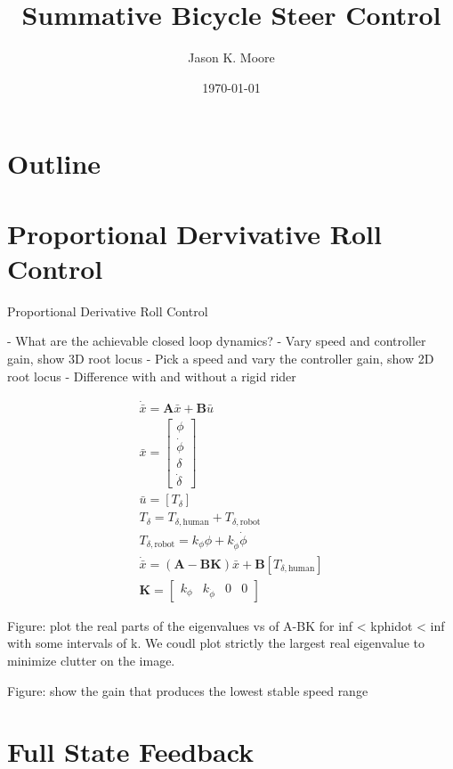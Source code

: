 \documentclass[12pt]{article}
\title{Summative Bicycle Steer Control}
\author{Jason K. Moore}
\date{\today}
\begin{document}
\maketitle

\section{Outline}

\section{Proportional Dervivative Roll Control}

Proportional Derivative Roll Control

- What are the achievable closed loop dynamics?
- Vary speed and controller gain, show 3D root locus
- Pick a speed and vary the controller gain, show 2D root locus
- Difference with and without a rigid rider

\begin{align}
  \dot{\bar{x}} = \mathbf{A} \bar{x} + \mathbf{B} \bar{u} \\
  \bar{x} = \begin{bmatrix} \phi \\ \dot{\phi} \\ \delta \\ \dot{\delta} \end{bmatrix} \\
  \bar{u} = \left[ T_\delta \right] \\
  T_\delta = T_{\delta,\textrm{human}} + T_{\delta,\textrm{robot}} \\
  T_{\delta,\textrm{robot}} = k_\phi \phi + k_{\dot{\phi}} \dot{\phi} \\
  \dot{\bar{x}} = \left( \mathbf{A} - \mathbf{B} \mathbf{K} \right) \bar{x} + \mathbf{B} \left[ T_{\delta,\textrm{human}} \right] \\
  \mathbf{K} = \begin{bmatrix} k_\phi & k_{\dot{\phi}} & 0 & 0 \end{bmatrix}
\end{align}

Figure: plot the real parts of the eigenvalues vs of A-BK for inf < kphidot <
inf with some intervals of k. We coudl plot strictly the largest real
eigenvalue to minimize clutter on the image.

Figure: show the gain that produces the lowest stable speed range

\section{Full State Feedback}
\end{document}
